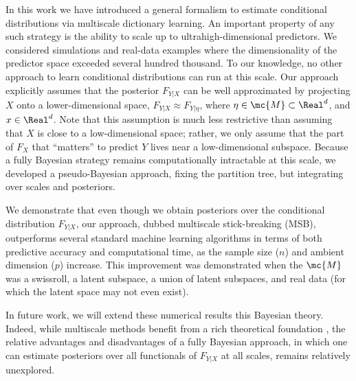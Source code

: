 In this work we have introduced a general formalism to estimate conditional distributions via  multiscale dictionary learning.  An important property of any such strategy is the ability to scale up to ultrahigh-dimensional predictors.  We considered simulations and real-data examples where the dimensionality of the predictor space exceeded several hundred thousand.  To our knowledge, no other approach to learn conditional distributions can run at this scale.  Our approach explicitly assumes that the posterior $F_{Y|X}$ can be well approximated by projecting $X$ onto a lower-dimensional space, $F_{Y|X} \approx F_{Y|\eta}$, where $\eta \in \mc{M} \subset \Real^d$, and $x \in \Real^d$.   Note that this assumption is much less restrictive than assuming that $X$ is close to a low-dimensional space; rather, we only assume that the part of $F_X$ that ``matters'' to predict $Y$ lives near a low-dimensional subspace.  Because a fully Bayesian strategy remains computationally intractable at this scale, we developed a pseudo-Bayesian approach, fixing the partition tree, but integrating over scales and posteriors.

We demonstrate that even though we obtain posteriors over the conditional distribution $F_{Y|X}$, our approach, dubbed multiscale stick-breaking (MSB), outperforms several standard machine learning algorithms in terms of both predictive accuracy and computational time, as the sample size ($n$) and ambient dimension ($p$) increase.  This improvement was demonstrated when the $\mc{M}$ was a swissroll, a latent subspace, a union of latent subspaces, and real data (for which the latent space may not even exist).    

In future work, we will extend these numerical results this Bayesian theory.  Indeed, while multiscale methods benefit from a rich theoretical foundation \cite{Allard2012}, the relative advantages and disadvantages of a fully Bayesian approach, in which one can estimate posteriors over all functionals of $F_{Y|X}$ at all scales, remains relatively unexplored.  


 
 






































